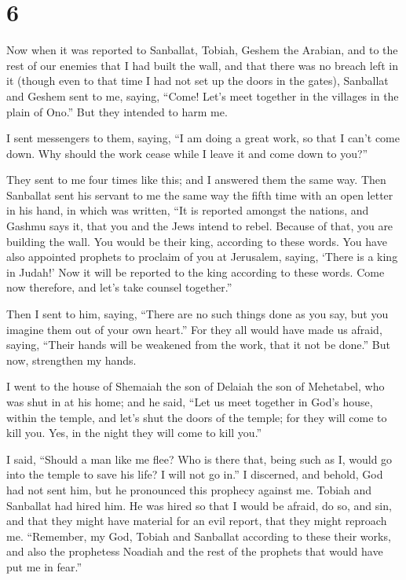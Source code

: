 \hypertarget{section-5}{%
\section{6}\label{section-5}}

 Now when it was reported to Sanballat, Tobiah, Geshem the
Arabian, and to the rest of our enemies that I had built the wall, and
that there was no breach left in it (though even to that time I had not
set up the doors in the gates),  Sanballat and Geshem sent
to me, saying, ``Come! Let's meet together in the villages in the plain
of Ono.'' But they intended to harm me.

 I sent messengers to them, saying, ``I am doing a great
work, so that I can't come down. Why should the work cease while I leave
it and come down to you?''

 They sent to me four times like this; and I answered them
the same way.  Then Sanballat sent his servant to me the
same way the fifth time with an open letter in his hand,  in
which was written, ``It is reported amongst the nations, and Gashmu says
it, that you and the Jews intend to rebel. Because of that, you are
building the wall. You would be their king, according to these words.
 You have also appointed prophets to proclaim of you at
Jerusalem, saying, `There is a king in Judah!' Now it will be reported
to the king according to these words. Come now therefore, and let's take
counsel together.''

 Then I sent to him, saying, ``There are no such things done
as you say, but you imagine them out of your own heart.'' 
For they all would have made us afraid, saying, ``Their hands will be
weakened from the work, that it not be done.'' But now, strengthen my
hands.

 I went to the house of Shemaiah the son of Delaiah the son
of Mehetabel, who was shut in at his home; and he said, ``Let us meet
together in God's house, within the temple, and let's shut the doors of
the temple; for they will come to kill you. Yes, in the night they will
come to kill you.''

 I said, ``Should a man like me flee? Who is there that,
being such as I, would go into the temple to save his life? I will not
go in.''  I discerned, and behold, God had not sent him,
but he pronounced this prophecy against me. Tobiah and Sanballat had
hired him.  He was hired so that I would be afraid, do so,
and sin, and that they might have material for an evil report, that they
might reproach me.  ``Remember, my God, Tobiah and
Sanballat according to these their works, and also the prophetess
Noadiah and the rest of the prophets that would have put me in fear.''

